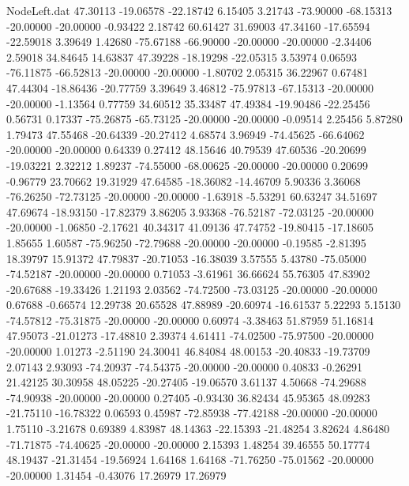 \begin{filecontents}{NodeLeft.dat}
  47.30113  -19.06578  -22.18742     6.15405    3.21743  -73.90000  -68.15313  -20.00000  -20.00000   -0.93422    2.18742   60.61427   31.69003
  47.34160  -17.65594  -22.59018     3.39649    1.42680  -75.67188  -66.90000  -20.00000  -20.00000   -2.34406    2.59018   34.84645   14.63837
  47.39228  -18.19298  -22.05315     3.53974    0.06593  -76.11875  -66.52813  -20.00000  -20.00000   -1.80702    2.05315   36.22967    0.67481
  47.44304  -18.86436  -20.77759     3.39649    3.46812  -75.97813  -67.15313  -20.00000  -20.00000   -1.13564    0.77759   34.60512   35.33487
  47.49384  -19.90486  -22.25456     0.56731    0.17337  -75.26875  -65.73125  -20.00000  -20.00000   -0.09514    2.25456    5.87280    1.79473
  47.55468  -20.64339  -20.27412     4.68574    3.96949  -74.45625  -66.64062  -20.00000  -20.00000    0.64339    0.27412   48.15646   40.79539
  47.60536  -20.20699  -19.03221     2.32212    1.89237  -74.55000  -68.00625  -20.00000  -20.00000    0.20699   -0.96779   23.70662   19.31929
  47.64585  -18.36082  -14.46709     5.90336    3.36068  -76.26250  -72.73125  -20.00000  -20.00000   -1.63918   -5.53291   60.63247   34.51697
  47.69674  -18.93150  -17.82379     3.86205    3.93368  -76.52187  -72.03125  -20.00000  -20.00000   -1.06850   -2.17621   40.34317   41.09136
  47.74752  -19.80415  -17.18605     1.85655    1.60587  -75.96250  -72.79688  -20.00000  -20.00000   -0.19585   -2.81395   18.39797   15.91372
  47.79837  -20.71053  -16.38039     3.57555    5.43780  -75.05000  -74.52187  -20.00000  -20.00000    0.71053   -3.61961   36.66624   55.76305
  47.83902  -20.67688  -19.33426     1.21193    2.03562  -74.72500  -73.03125  -20.00000  -20.00000    0.67688   -0.66574   12.29738   20.65528
  47.88989  -20.60974  -16.61537     5.22293    5.15130  -74.57812  -75.31875  -20.00000  -20.00000    0.60974   -3.38463   51.87959   51.16814
  47.95073  -21.01273  -17.48810     2.39374    4.61411  -74.02500  -75.97500  -20.00000  -20.00000    1.01273   -2.51190   24.30041   46.84084
  48.00153  -20.40833  -19.73709     2.07143    2.93093  -74.20937  -74.54375  -20.00000  -20.00000    0.40833   -0.26291   21.42125   30.30958
  48.05225  -20.27405  -19.06570     3.61137    4.50668  -74.29688  -74.90938  -20.00000  -20.00000    0.27405   -0.93430   36.82434   45.95365
  48.09283  -21.75110  -16.78322     0.06593    0.45987  -72.85938  -77.42188  -20.00000  -20.00000    1.75110   -3.21678    0.69389    4.83987
  48.14363  -22.15393  -21.48254     3.82624    4.86480  -71.71875  -74.40625  -20.00000  -20.00000    2.15393    1.48254   39.46555   50.17774
  48.19437  -21.31454  -19.56924     1.64168    1.64168  -71.76250  -75.01562  -20.00000  -20.00000    1.31454   -0.43076   17.26979   17.26979

\end{filecontents}
